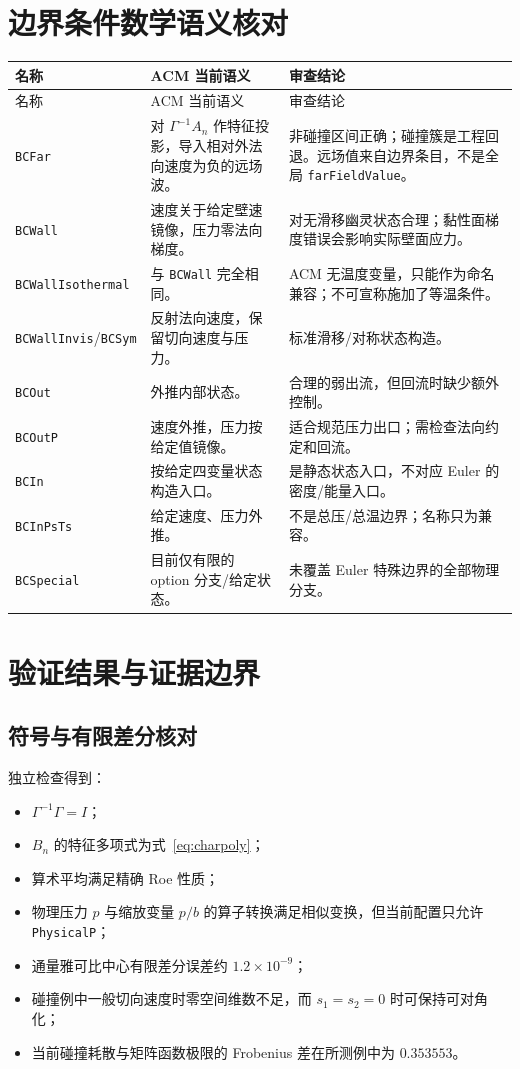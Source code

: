 \documentclass[UTF8,11pt,a4paper]{ctexart}
\newcommand{\code}[1]{\nolinkurl{#1}}
\begin{document}
\section{边界条件数学语义核对}

\begin{longtable}{p{}p{}p{}}
\toprule
名称 & ACM 当前语义 & 审查结论\\
\midrule
\endfirsthead
\toprule
名称 & ACM 当前语义 & 审查结论\\
\midrule
\endhead
\code{BCFar} & 对 $\Gamma^{-1}A_n$ 作特征投影，导入相对外法向速度为负的远场波。 & 非碰撞区间正确；碰撞簇是工程回退。远场值来自边界条目，不是全局 \code{farFieldValue}。\\
\code{BCWall} & 速度关于给定壁速镜像，压力零法向梯度。 & 对无滑移幽灵状态合理；黏性面梯度错误会影响实际壁面应力。\\
\code{BCWallIsothermal} & 与 \code{BCWall} 完全相同。 & ACM 无温度变量，只能作为命名兼容；不可宣称施加了等温条件。\\
\code{BCWallInvis}/\code{BCSym} & 反射法向速度，保留切向速度与压力。 & 标准滑移/对称状态构造。\\
\code{BCOut} & 外推内部状态。 & 合理的弱出流，但回流时缺少额外控制。\\
\code{BCOutP} & 速度外推，压力按给定值镜像。 & 适合规范压力出口；需检查法向约定和回流。\\
\code{BCIn} & 按给定四变量状态构造入口。 & 是静态状态入口，不对应 Euler 的密度/能量入口。\\
\code{BCInPsTs} & 给定速度、压力外推。 & 不是总压/总温边界；名称只为兼容。\\
\code{BCSpecial} & 目前仅有限的 option 分支/给定状态。 & 未覆盖 Euler 特殊边界的全部物理分支。\\
\bottomrule
\end{longtable}

\section{验证结果与证据边界}

\subsection{符号与有限差分核对}

独立检查得到：

\begin{itemize}
  \item $\Gamma^{-1}\Gamma=I$；
  \item $B_n$ 的特征多项式为式~\eqref{eq:charpoly}；
  \item 算术平均满足精确 Roe 性质；
  \item 物理压力 $p$ 与缩放变量 $p/b$ 的算子转换满足相似变换，但当前配置只允许 \code{PhysicalP}；
  \item 通量雅可比中心有限差分误差约 $1.2\times10^{-9}$；
  \item 碰撞例中一般切向速度时零空间维数不足，而 $s_1=s_2=0$ 时可保持可对角化；
  \item 当前碰撞耗散与矩阵函数极限的 Frobenius 差在所测例中为 $0.353553$。
\end{itemize}
\end{document}
